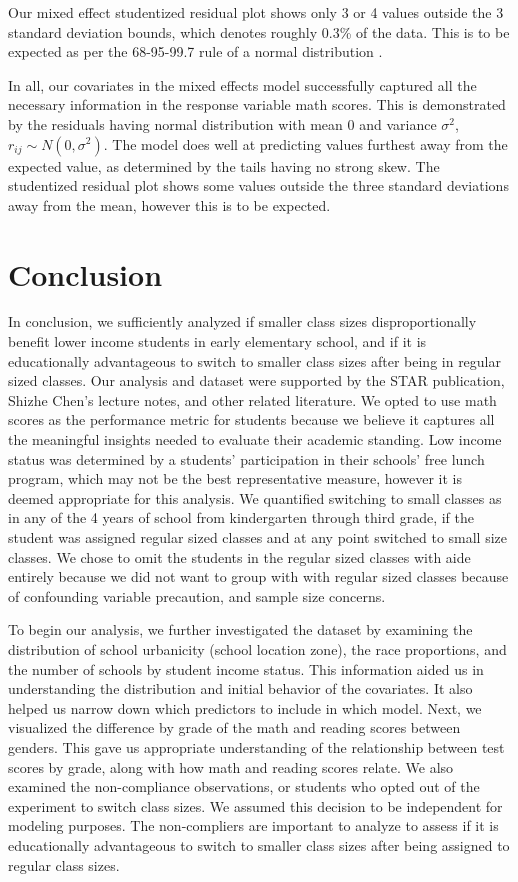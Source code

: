 \documentclass[11pt]{article}
\begin{document}
Our mixed effect studentized residual plot shows only 3 or 4 values outside the 3 standard deviation bounds, which denotes roughly 0.3\% of the data. This is to be expected as per the 68-95-99.7 rule of a normal distribution \cite{Michael2019_normal_dist}. 

In all, our covariates in the mixed effects model successfully captured all the necessary information in the response variable math scores. This is demonstrated by the residuals having normal distribution with mean 0 and variance $\sigma^2$, $r_{ij} \sim N(0, \sigma^2)$. The model does well at predicting values furthest away from the expected value, as determined by the tails having no strong skew. The studentized residual plot shows some values outside the three standard deviations away from the mean, however this is to be expected. 

\section{Conclusion}\par
\label{section:conclusion}

In conclusion, we sufficiently analyzed if smaller class sizes disproportionally benefit lower income students in early elementary school, and if it is educationally advantageous to switch to smaller class sizes after being in regular sized classes. Our analysis and dataset were supported by the STAR publication, Shizhe Chen's lecture notes, and other related literature. We opted to use math scores as the performance metric for students because we believe it captures all the meaningful insights needed to evaluate their academic standing. Low income status was determined by a students' participation in their schools' free lunch program, which may not be the best representative measure, however it is deemed appropriate for this analysis. We quantified switching to small classes as in any of the 4 years of school from kindergarten through third grade, if the student was assigned regular sized classes and at any point switched to small size classes. We chose to omit the students in the regular sized classes with aide entirely because we did not want to group with with regular sized classes because of confounding variable precaution, and sample size concerns. 

To begin our analysis, we further investigated the dataset by examining the distribution of school urbanicity (school location zone), the race proportions, and the number of schools by student income status. This information aided us in understanding the distribution and initial behavior of the covariates. It also helped us narrow down which predictors to include in which model. Next, we visualized the difference by grade of the math and reading scores between genders. This gave us appropriate understanding of the relationship between test scores by grade, along with how math and reading scores relate. We also examined the non-compliance observations, or students who opted out of the experiment to switch class sizes. We assumed this decision to be independent for modeling purposes. The non-compliers are important to analyze to assess if it is educationally advantageous to switch to smaller class sizes after being assigned to regular class sizes. 
\end{document}
